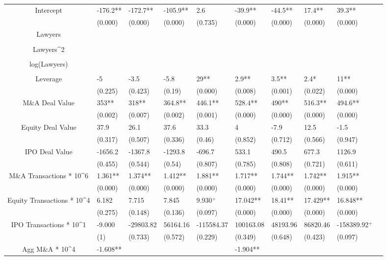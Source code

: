 \documentclass{article}
\begin{document}
\begin{table}[H]
\begin{tabular}{|clllllllll|}
Intercept & -176.2** & -172.7** & -105.9** & 2.6 & -39.9** & -44.5** & 17.4** & 39.3** & \\
   & (0.000) & (0.000) & (0.000) & (0.735) & (0.000) & (0.000) & (0.000) & (0.000) & \\
  Lawyers &  &  &  &  &  &  &  &  & \\
   &  &  &  &  &  &  &  &  & \\
  Lawyers^2 &  &  &  &  &  &  &  &  & \\
   &  &  &  &  &  &  &  &  & \\
  log(Lawyers) &  &  &  &  &  &  &  &  & \\
   &  &  &  &  &  &  &  &  & \\
  Leverage & -5 & -3.5 & -5.8 & 29** & 2.9** & 3.5** & 2.4* & 11** & \\
   & (0.225) & (0.423) & (0.19) & (0.000) & (0.008) & (0.001) & (0.022) & (0.000) & \\
  M\&A Deal Value & 353** & 318** & 364.8** & 446.1** & 528.4** & 490** & 516.3** & 494.6** & \\
   & (0.002) & (0.007) & (0.002) & (0.001) & (0.000) & (0.000) & (0.000) & (0.000) & \\
  Equity Deal Value & 37.9 & 26.1 & 37.6 & 33.3 & 4 & -7.9 & 12.5 & -1.5 & \\
   & (0.317) & (0.507) & (0.336) & (0.46) & (0.852) & (0.712) & (0.566) & (0.947) & \\
  IPO Deal Value & -1656.2 & -1367.8 & -1293.8 & -696.7 & 533.1 & 490.5 & 677.3 & 1126.9 & \\
   & (0.455) & (0.544) & (0.54) & (0.807) & (0.785) & (0.808) & (0.721) & (0.611) & \\
  M\&A Transactions * 10^6 & 1.361** & 1.374** & 1.412** & 1.881** & 1.717** & 1.744** & 1.742** & 1.915** & \\
   & (0.000) & (0.000) & (0.000) & (0.000) & (0.000) & (0.000) & (0.000) & (0.000) & \\
  Equity Transactions * 10^4 & 6.182 & 7.715 & 7.845 & 9.930$^{+}$ & 17.042** & 18.41** & 17.429** & 16.848** & \\
   & (0.275) & (0.148) & (0.136) & (0.097) & (0.000) & (0.000) & (0.000) & (0.000) & \\
  IPO Transactions * 10^1 & -9.000 & -29803.82 & 56164.16 & -115584.37 & 100163.08 & 48193.96 & 86820.46 & -158389.92$^{+}$ & \\
   & (1) & (0.733) & (0.572) & (0.229) & (0.349) & (0.648) & (0.423) & (0.097) & \\
  Agg M\&A * 10^4 & -1.608** &  &  &  & -1.904** &  &  &  & \\

\end{tabular}
\end{table}
\end{document}
